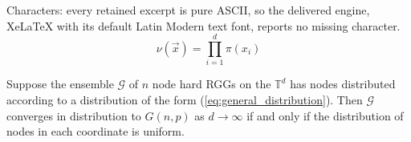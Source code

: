 \documentclass[10pt,a4paper]{amsart}
\newcommand{\graph}{\mathcal{G}}
\newcommand{\tti}{\rightarrow\infty}
\begin{document}
Characters: every retained excerpt is pure ASCII, so the delivered engine, XeLaTeX with its default Latin Modern text font, reports no missing character.
\begin{equation}
    \label{eq:general_distribution}
    \nu(\vec{x}) = \prod_{i=1}^d \pi(x_i)
\end{equation}

\begin{theorem}
\label{no convergence for gaussian in torus thm}
    Suppose the ensemble $\graph$ of $n$ node hard RGGs on the $\mathbb{T}^d$ has nodes distributed according to a distribution of the form (\ref{eq:general_distribution}). Then $\graph$ converges in distribution to $G(n,p)$ as $d\tti$ if and only if the distribution of nodes in each coordinate is uniform.
\end{theorem}
\end{document}
